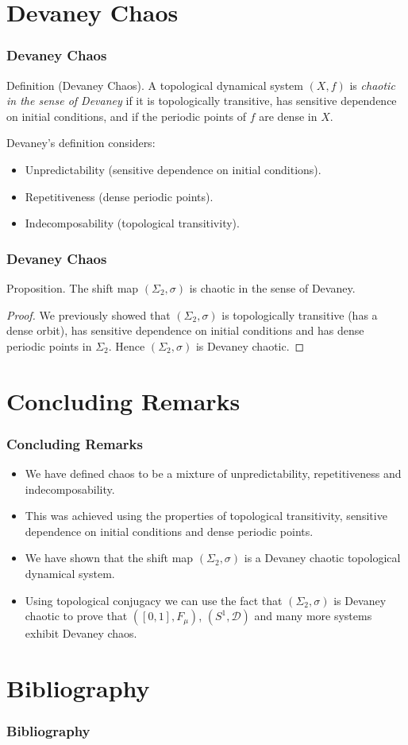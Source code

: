 \documentclass{beamer}
\begin{document}
\section{Devaney Chaos}
\begin{frame}
    \frametitle{Devaney Chaos}
    \begin{block}{Definition (Devaney Chaos).}
        A topological dynamical system $(X, f)$ is \emph{chaotic in the sense of Devaney} if it is topologically transitive, has sensitive dependence on initial conditions, and if the periodic points of $f$ are dense in $X$.
    \end{block}
    \vspace{0.5cm}
    Devaney's definition considers:
    \begin{itemize}
        \item Unpredictability (sensitive dependence on initial conditions).
        \item Repetitiveness (dense periodic points).
        \item Indecomposability (topological transitivity).
    \end{itemize}
\end{frame}

\begin{frame}
    \frametitle{Devaney Chaos}
    \begin{block}{Proposition.}
        The shift map $(\Sigma_2, \sigma)$ is chaotic in the sense of Devaney.
        \begin{proof}
            We previously showed that $(\Sigma_2, \sigma)$ is topologically transitive (has a dense orbit), has sensitive dependence on initial conditions and has dense periodic points in $\Sigma_2$. Hence $(\Sigma_2, \sigma)$ is Devaney chaotic.
        \end{proof}
    \end{block}
\end{frame}

\section{Concluding Remarks}
\begin{frame}
    \frametitle{Concluding Remarks}
    \begin{itemize}
        \item We have defined chaos to be a mixture of unpredictability, repetitiveness and indecomposability.
        \item This was achieved using the properties of topological transitivity, sensitive dependence on initial conditions and dense periodic points.
        \item We have shown that the shift map $(\Sigma_2, \sigma)$ is a Devaney chaotic topological dynamical system.
        \item Using topological conjugacy we can use the fact that $(\Sigma_2, \sigma)$ is Devaney chaotic to prove that  $([0, 1], F_\mu)$, $(S^1, \mathcal{D})$ and many more systems exhibit Devaney chaos.
    \end{itemize}
\end{frame}

\section{Bibliography}
\begin{frame}
    \frametitle{Bibliography}
    
\end{frame}
\end{document}
